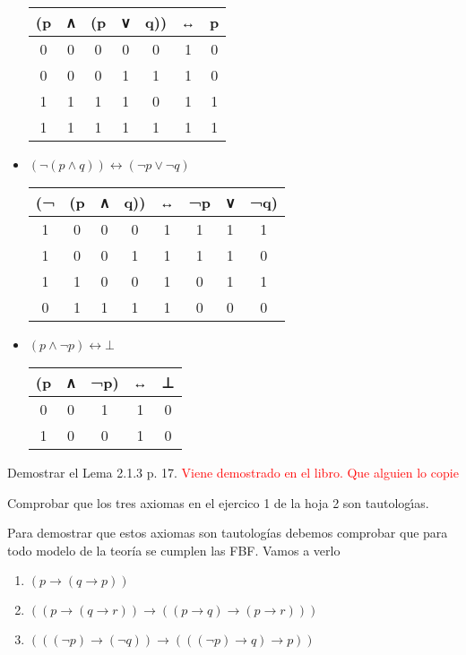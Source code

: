\begin{problem}[4]
\begin{itemize}
\begin{center}
\begin{tabular}{|c|c|c|c|c|c|c|}
\hline
(p & ∧ & (p & ∨ & q)) & ↔ & p \\
\hline
 0 & 0 & 0 & 0 & 0 & 1 & 0\\
\hline
 0 & 0 & 0 & 1 & 1 & 1 & 0\\
\hline
 1 & 1 & 1 & 1 & 0 & 1 & 1\\
\hline
 1 & 1 & 1 & 1 & 1 & 1 & 1\\
\hline
\end{tabular}
\end{center}
\item \textbf{$(¬(p ∧ q)) ↔ (¬p ∨ ¬q)$}
\begin{center}
\begin{tabular}{|c|c|c|c|c|c|c|c|}
\hline
(¬ & (p & ∧ & q)) & ↔ & ¬p & ∨ & ¬q)\\
\hline
1 & 0 & 0 & 0 & 1 & 1 & 1 & 1\\
\hline
1 & 0 & 0 & 1 & 1 & 1 & 1 & 0\\
\hline
1 & 1 & 0 & 0 & 1 & 0 & 1 & 1\\
\hline
0 & 1 & 1 & 1 & 1 & 0 & 0 & 0\\
\hline
\end{tabular}
\end{center}
\item \textbf{$(p ∧ ¬p) ↔ ⊥$}
\begin{center}
\begin{tabular}{|c|c|c|c|c|}
\hline
(p & ∧ & ¬p) & ↔ & ⊥\\
\hline
0 & 0 & 1 & 1 & 0 \\
\hline
1 & 0 & 0 & 1 & 0 \\
\hline
\end{tabular}
\end{center}
\end{itemize}

\end{problem}



\begin{problem}[5]
Demostrar el Lema 2.1.3 p. 17.
\solution
\textcolor{red}{Viene demostrado en el libro. Que alguien lo copie}
\end{problem}



\begin{problem}[6]
Comprobar que los tres axiomas en el ejercico 1 de la hoja 2 son tautolog\'{\i}as.
\solution

Para demostrar que estos axiomas son tautologías debemos comprobar que para todo modelo de la teoría se cumplen las FBF. Vamos a verlo
\begin{enumerate}
\item  $ (p\to (q\to p))$
\item $( (p\to (q\to r)) \to  ( (p\to q) \to (p\to r)))$
\item $(( (\neg p) \to (\neg q)) \to  ( ((\neg p) \to q) \to p))$
\end{enumerate}

\end{problem}


